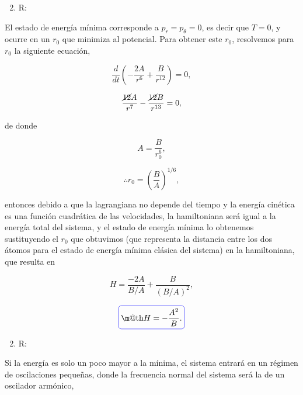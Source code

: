 \documentclass[a4paper,10pt]{article}
\makeatletter
\numberwithin{equation}{section}
\newcommand*{\boxcolor}{blue}
\renewcommand{\boxed}[1]{\textcolor{\boxcolor}{%
\tikz[baseline={([yshift=-1ex]current bounding box.center)}] \node [rectangle, minimum width=1ex,rounded corners,draw] {\normalcolor\m@th$\displaystyle#1$};}}
\makeatother
\begin{document}
\begin{enumerate}[label=\alph*)]
\setcounter{enumi}{1}
 \item R:
\end{enumerate}

El estado de energía mínima corresponde a $p_r = p_\theta = 0$, es decir que 
$T=0$, y ocurre en un $r_0$ que minimiza al potencial. Para obtener este $r_0$, 
resolvemos para $r_0$ la siguiente ecuación, 

\begin{equation}
 \frac{d}{dt}\left(-\frac{2A}{r^6} + \frac{B}{r^{12}} \right) = 0,
\end{equation}

\begin{equation}
 \frac{\cancel{12}A}{r^7} - \frac{\cancel{12}B}{r^{13}} = 0,
\end{equation}

de donde 

\begin{equation}
 A = \frac{B}{r_0^6},
\end{equation}

\begin{equation}
 \therefore r_0 = \left( \frac{B}{A}\right)^{1/6},
\end{equation}

entonces debido a que la lagrangiana no depende del tiempo y la energía cinética 
es una función cuadrática de las velocidades, la hamiltoniana será igual a la energía 
total del sistema, y el estado de energía mínima lo obtenemos sustituyendo el $r_0$ 
que obtuvimos (que representa la distancia entre los dos átomos para el estado de 
energía mínima clásica del sistema) en la hamiltoniana, que resulta en 

\begin{equation}
 H = \frac{-2A}{B/A} + \frac{B}{(B/A)^2},
\end{equation}

\begin{equation}
 \boxed{H = - \frac{A^2}{B}.}
\end{equation}

\begin{enumerate}[label=\alph*)]
\setcounter{enumi}{1}
 \item R:
\end{enumerate}

Si la energía es solo un poco mayor a la mínima, el sistema entrará en un régimen de 
oscilaciones pequeñas, donde la frecuencia normal del sistema será la de un oscilador 
armónico, 
\end{document}
